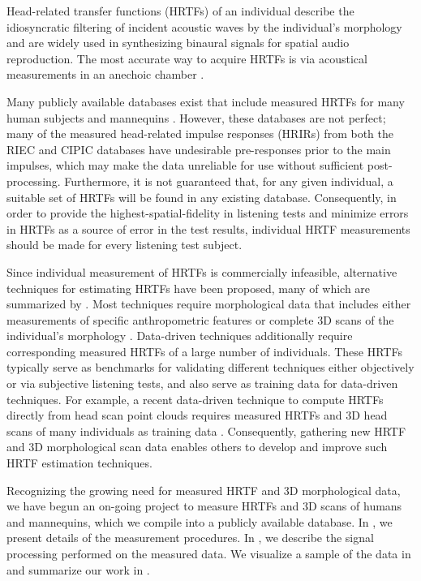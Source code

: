 Head-related transfer functions (HRTFs) of an individual describe the idiosyncratic filtering of incident acoustic waves by the individual's morphology and are widely used in synthesizing binaural signals for spatial audio reproduction.
The most accurate way to acquire HRTFs is via acoustical measurements in an anechoic chamber \citep[chapter 2]{Xie2013}.

Many publicly available databases exist that include measured HRTFs for many human subjects and mannequins \citep[for example]{SOFAHRTFDatabasesURL}.
However, these databases are not perfect; many of the measured head-related impulse responses (HRIRs) from both the RIEC \citep{Watanabe2014,RIECHRTFDatabaseURL} and CIPIC \citep{Algazi2001} databases have undesirable pre-responses prior to the main impulses, which may make the data unreliable for use without sufficient post-processing.
Furthermore, it is not guaranteed that, for any given individual, a suitable set of HRTFs will be found in any existing database.
Consequently, in order to provide the highest-spatial-fidelity in listening tests and minimize errors in HRTFs as a source of error in the test results, individual HRTF measurements should be made for every listening test subject.

Since individual measurement of HRTFs is commercially infeasible, alternative techniques for estimating HRTFs have been proposed, many of which are summarized by \citet{Xie2013}.
Most techniques require morphological data that includes either measurements of specific anthropometric features \citep{Bilinski2014} or complete 3D scans of the individual's morphology \citep{Gumerov2010}.
Data-driven techniques additionally require corresponding measured HRTFs of a large number of individuals.
These HRTFs typically serve as benchmarks for validating different techniques either objectively or via subjective listening tests, and also serve as training data for data-driven techniques.
For example, a recent data-driven technique to compute HRTFs directly from head scan point clouds requires measured HRTFs and 3D head scans of many individuals as training data \citep{SridharChoueiri2017}.
Consequently, gathering new HRTF and 3D morphological scan data enables others to develop and improve such HRTF estimation techniques.

Recognizing the growing need for measured HRTF and 3D morphological data, we have begun an on-going project to measure HRTFs and 3D scans of humans and mannequins, which we compile into a publicly available database.
In , we present details of the measurement procedures.
In , we describe the signal processing performed on the measured data.
We visualize a sample of the data in  and summarize our work in .